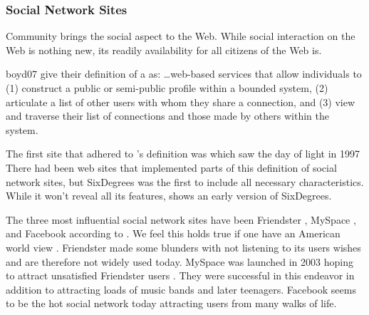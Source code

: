 \subsubsection{Social Network Sites}
Community brings the social aspect to the Web. While social
interaction on the Web is nothing new, its readily availability for all
citizens of the Web is.

\begin{fullquote}{boyd07}{%
  give their definition of a  as:}
    \ldots web-based services that allow individuals to (1) construct a public
    or semi-public profile within a bounded system, (2) articulate a list of
    other users with whom they share a connection, and (3) view and traverse
    their list of connections and those made by others within the system.
\end{fullquote}

The first site that adhered to \citeauthor{boyd07}'s definition was
 which saw the day of light in 1997%
There had been web sites that implemented
parts of this definition of social network sites, but SixDegrees was the
first to include all necessary characteristics. While it won't reveal
all its features,  shows an early
version of SixDegrees.

The three most influential social network sites have been Friendster%
,
MySpace%
,
and Facebook%
according to \citet{boyd07}. We feel this holds true if
one have an American world view%
.
Friendster made some blunders with not listening to its users
wishes and are therefore not widely used today. MySpace was launched in
2003 hoping to attract unsatisfied Friendster users \citep{boyd07}.
They were successful in this endeavor in addition to attracting loads of
music bands and later teenagers.
Facebook seems to be the hot social network today%
attracting users from many walks of life.

